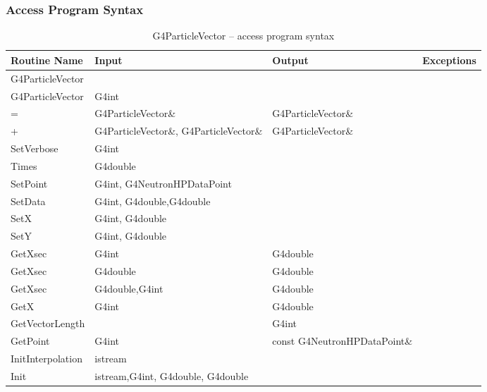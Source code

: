 \documentclass[12pt]{article}
\begin{document}
\subsubsection{Access Program Syntax}%
\begin{longtable}{p{}p{}p{}p{}}
\caption{G4ParticleVector -- access program syntax}\label{Table_NeutronHPVectorInterface}\\
\toprule
\bf Routine Name & \bf Input & \bf Output & \bf Exceptions \\\midrule
\arrayrulecolor{lightgray}
G4ParticleVector & & & \\\hline
G4ParticleVector & G4int & & \\\hline
= & G4ParticleVector\& & G4ParticleVector\& &\\\hline
+ & G4ParticleVector\&, G4ParticleVector\& & G4ParticleVector\& &\\\hline
SetVerbose & G4int & & \\\hline
Times &G4double & & \\\hline
SetPoint  &G4int, G4NeutronHPDataPoint & & \\\hline
SetData & G4int, G4double,G4double& & \\\hline
SetX & G4int, G4double & & \\\hline
SetY & G4int, G4double & & \\\hline
GetXsec & G4int & G4double & \\\hline
GetXsec & G4double & G4double & \\\hline
GetXsec & G4double,G4int & G4double & \\\hline
GetX & G4int & G4double & \\\hline
GetVectorLength & & G4int & \\\hline
GetPoint & G4int & const G4NeutronHPDataPoint\& & \\\hline
InitInterpolation & istream & & \\\hline
Init & istream,G4int, G4double, G4double& & \\\hline

\end{longtable}
\end{document}
